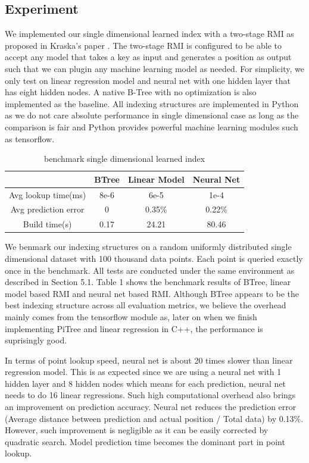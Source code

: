 \documentclass[sigconf,10pt]{acmart}
\begin{document}
\subsection{Experiment}

We implemented our single dimensional learned index with a two-stage RMI as proposed in 
Kraska's paper \cite{Learned_Index}. The two-stage RMI is configured to be able to accept
any model that takes a key as input and generates a position as output such that we can
plugin any machine learning model as needed. For simplicity, we only test on linear regression
model and neural net with one hidden layer that has eight hidden nodes. A native B-Tree with no optimization is also implemented
as the baseline. All indexing structures are implemented in Python as we do not care absolute
performance in single dimensional case as long as the comparison is fair and Python provides powerful
machine learning modules such as tensorflow. 

\begin{table}
  \centering
  \begin{tabular}{|c|c|c|c|}
    \hline
     & BTree & Linear Model & Neural Net \\
    \hline
    Avg lookup time(ms) & 8e-6 & 6e-5 & 1e-4 \\
    \hline 
    Avg prediction error & 0 & 0.35\% & 0.22\% \\
    \hline 
    Build time(s) & 0.17 & 24.21 & 80.46 \\
    \hline 
  \end{tabular}
  \caption{benchmark single dimensional learned index}
  \label{table:single-dimensional-learned-index-benchmark}
\end{table}

We benmark our indexing structures on a random uniformly distributed single dimensional
dataset with 100 thousand data points. Each point is queried exactly once in the benchmark.
All tests are conducted under the same environment as described in Section 5.1. Table 1 shows
the benchmark results of BTree, linear model based RMI and neural net based RMI. Although
BTree appears to be the best indexing structure across all evaluation metrics, we believe the
overhead mainly comes from the tensorflow module as, later on when we finish implementing PiTree
and linear regression in C++, the performance is suprisingly good.

In terms of point lookup speed, neural net is about 20 times slower than linear regression model.
This is as expected since we are using a neural net with 1 hidden layer and 8 hidden nodes which
means for each prediction, neural net needs to do 16 linear regressions. Such high computational
overhead also brings an improvement on prediction accuracy. Neural net reduces the prediction
error (Average distance between prediction and actual position / Total data) by 0.13\%. However,
such improvement is negligible as it can be easily corrected by quadratic search. Model prediction
time becomes the dominant part in point lookup.
\end{document}
